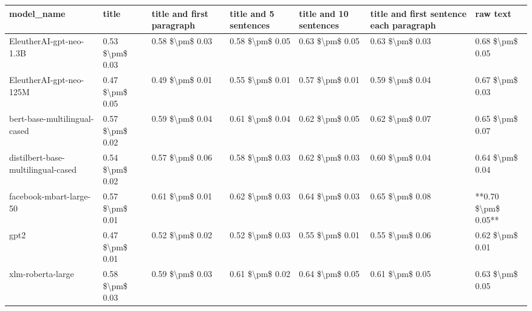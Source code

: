\begin{tabular}{lllllll}
\toprule
                        model\_name &           title & title and first paragraph & title and 5 sentences & title and 10 sentences & title and first sentence each paragraph &            raw text \\
\midrule
           EleutherAI-gpt-neo-1.3B & 0.53 \$\textbackslash pm\$ 0.03 &           0.58 \$\textbackslash pm\$ 0.03 &       0.58 \$\textbackslash pm\$ 0.05 &        0.63 \$\textbackslash pm\$ 0.05 &                         0.63 \$\textbackslash pm\$ 0.03 &     0.68 \$\textbackslash pm\$ 0.05 \\
           EleutherAI-gpt-neo-125M & 0.47 \$\textbackslash pm\$ 0.05 &           0.49 \$\textbackslash pm\$ 0.01 &       0.55 \$\textbackslash pm\$ 0.01 &        0.57 \$\textbackslash pm\$ 0.01 &                         0.59 \$\textbackslash pm\$ 0.04 &     0.67 \$\textbackslash pm\$ 0.03 \\
      bert-base-multilingual-cased & 0.57 \$\textbackslash pm\$ 0.02 &           0.59 \$\textbackslash pm\$ 0.04 &       0.61 \$\textbackslash pm\$ 0.04 &        0.62 \$\textbackslash pm\$ 0.05 &                         0.62 \$\textbackslash pm\$ 0.07 &     0.65 \$\textbackslash pm\$ 0.07 \\
distilbert-base-multilingual-cased & 0.54 \$\textbackslash pm\$ 0.02 &           0.57 \$\textbackslash pm\$ 0.06 &       0.58 \$\textbackslash pm\$ 0.03 &        0.62 \$\textbackslash pm\$ 0.03 &                         0.60 \$\textbackslash pm\$ 0.04 &     0.64 \$\textbackslash pm\$ 0.04 \\
           facebook-mbart-large-50 & 0.57 \$\textbackslash pm\$ 0.01 &           0.61 \$\textbackslash pm\$ 0.01 &       0.62 \$\textbackslash pm\$ 0.03 &        0.64 \$\textbackslash pm\$ 0.03 &                         0.65 \$\textbackslash pm\$ 0.08 & **0.70 \$\textbackslash pm\$ 0.05** \\
                              gpt2 & 0.47 \$\textbackslash pm\$ 0.01 &           0.52 \$\textbackslash pm\$ 0.02 &       0.52 \$\textbackslash pm\$ 0.03 &        0.55 \$\textbackslash pm\$ 0.01 &                         0.55 \$\textbackslash pm\$ 0.06 &     0.62 \$\textbackslash pm\$ 0.01 \\
                 xlm-roberta-large & 0.58 \$\textbackslash pm\$ 0.03 &           0.59 \$\textbackslash pm\$ 0.03 &       0.61 \$\textbackslash pm\$ 0.02 &        0.64 \$\textbackslash pm\$ 0.05 &                         0.61 \$\textbackslash pm\$ 0.05 &     0.63 \$\textbackslash pm\$ 0.05 \\
\bottomrule
\end{tabular}
